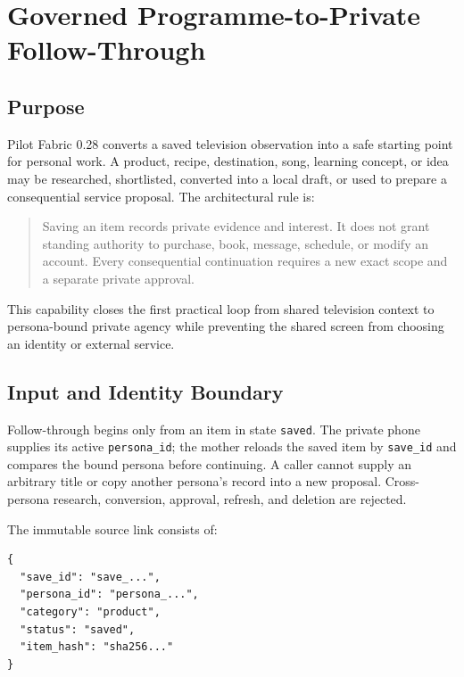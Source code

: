 
\section{Governed Programme-to-Private Follow-Through}
\label{sec:pilot-saved-item-followthrough}

\subsection{Purpose}

Pilot Fabric 0.28 converts a saved television observation into a safe starting
point for personal work.  A product, recipe, destination, song, learning
concept, or idea may be researched, shortlisted, converted into a local draft,
or used to prepare a consequential service proposal.  The architectural rule is:

\begin{quote}
Saving an item records private evidence and interest.  It does not grant
standing authority to purchase, book, message, schedule, or modify an account.
Every consequential continuation requires a new exact scope and a separate
private approval.
\end{quote}

This capability closes the first practical loop from shared television context
to persona-bound private agency while preventing the shared screen from choosing
an identity or external service.

\subsection{Input and Identity Boundary}

Follow-through begins only from an item in state \texttt{saved}.  The private
phone supplies its active \texttt{persona\_id}; the mother reloads the saved item
by \texttt{save\_id} and compares the bound persona before continuing.  A caller
cannot supply an arbitrary title or copy another persona's record into a new
proposal.  Cross-persona research, conversion, approval, refresh, and deletion
are rejected.

The immutable source link consists of:

\begin{verbatim}
{
  "save_id": "save_...",
  "persona_id": "persona_...",
  "category": "product",
  "status": "saved",
  "item_hash": "sha256..."
}
\end{verbatim}

